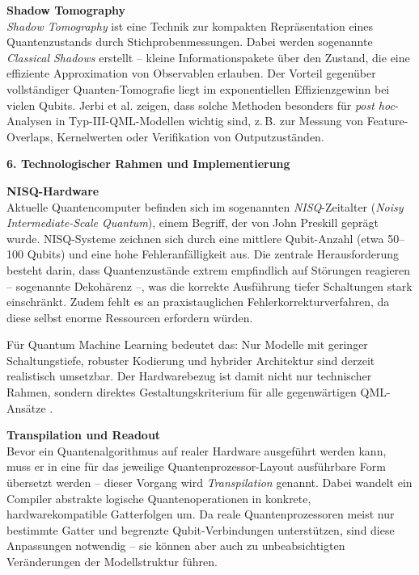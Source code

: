 \vspace{0.1cm}
\noindent
\textbf{Shadow Tomography}\\
\textit{Shadow Tomography} ist eine Technik zur kompakten Repräsentation eines Quantenzustands durch Stichprobenmessungen. Dabei werden sogenannte \textit{Classical Shadows} erstellt – kleine Informationspakete über den Zustand, die eine effiziente Approximation von Observablen erlauben. Der Vorteil gegenüber vollständiger Quanten-Tomografie liegt im exponentiellen Effizienzgewinn bei vielen Qubits. Jerbi et al. zeigen, dass solche Methoden besonders für \textit{post hoc}-Analysen in Typ-III-QML-Modellen wichtig sind, z.\,B. zur Messung von Feature-Overlaps, Kernelwerten oder Verifikation von Outputzuständen. \cite{jerbi_quantum_2023}

\vspace{1cm}
\noindent\textbf{6. Technologischer Rahmen und Implementierung}  

\vspace{0.3cm}
\noindent
\textbf{NISQ-Hardware}\\
\vspace{0.2cm}
Aktuelle Quantencomputer befinden sich im sogenannten \textit{NISQ}-Zeitalter (\textit{Noisy Intermediate-Scale Quantum}), einem Begriff, der von John Preskill geprägt wurde. NISQ-Systeme zeichnen sich durch eine mittlere Qubit-Anzahl (etwa 50–100 Qubits) und eine hohe Fehleranfälligkeit aus. Die zentrale Herausforderung besteht darin, dass Quantenzustände extrem empfindlich auf Störungen reagieren – sogenannte Dekohärenz –, was die korrekte Ausführung tiefer Schaltungen stark einschränkt. Zudem fehlt es an praxistauglichen Fehlerkorrekturverfahren, da diese selbst enorme Ressourcen erfordern würden.  

Für Quantum Machine Learning bedeutet das: Nur Modelle mit geringer Schaltungstiefe, robuster Kodierung und hybrider Architektur sind derzeit realistisch umsetzbar. Der Hardwarebezug ist damit nicht nur technischer Rahmen, sondern direktes Gestaltungskriterium für alle gegenwärtigen QML-Ansätze \cite{preskill_quantum_2018}.

\vspace{0.5cm}
\noindent
\textbf{Transpilation und Readout}\\
Bevor ein Quantenalgorithmus auf realer Hardware ausgeführt werden kann, muss er in eine für das jeweilige Quantenprozessor-Layout ausführbare Form übersetzt werden – dieser Vorgang wird \textit{Transpilation} genannt. Dabei wandelt ein Compiler abstrakte logische Quantenoperationen in konkrete, hardwarekompatible Gatterfolgen um. Da reale Quantenprozessoren meist nur bestimmte Gatter und begrenzte Qubit-Verbindungen unterstützen, sind diese Anpassungen notwendig – sie können aber auch zu unbeabsichtigten Veränderungen der Modellstruktur führen.

